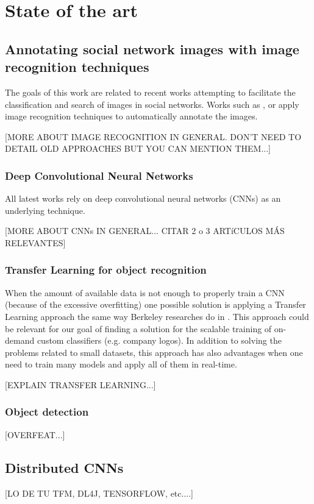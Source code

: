 
\chapter{State of the art}

\ifpdf
    \graphicspath{{Chapter2/Figs/Raster/}{Chapter2/Figs/PDF/}{Chapter2/Figs/}}
\else
    \graphicspath{{Chapter2/Figs/Vector/}{Chapter2/Figs/}}
\fi

\section[Short title]{Annotating social network images with image recognition techniques}

The goals of this work are related to recent works attempting to facilitate the classification and search of images in social networks. Works such as \cite{DBLP:journals/corr/ParkLK16}, \cite{conf/bigmm/TousTA15} or \cite{Denton:2015:UCH:2783258.2788576} apply image recognition techniques to automatically annotate the images. 

[MORE ABOUT IMAGE RECOGNITION IN GENERAL. DON'T NEED TO DETAIL OLD APPROACHES BUT YOU CAN MENTION THEM...]

\subsection{Deep Convolutional Neural Networks}

All latest works rely on deep convolutional neural networks (CNNs) as an underlying technique. 

[MORE ABOUT CNNs IN GENERAL... CITAR 2 o 3 ARTíCULOS MÁS RELEVANTES]

\subsection{Transfer Learning for object recognition}

When the amount of available data is not enough to properly train a CNN (because of the excessive overfitting) one possible solution is applying a Transfer Learning approach the same way Berkeley researches do in \cite{DBLP:conf/icml/DonahueJVHZTD14}. This approach could be relevant for our goal of finding a solution for the scalable training of on-demand custom classifiers (e.g. company logos). In addition to solving the problems related to small datasets, this approach has also advantages when one need to train many models and apply all of them in real-time.
  
[EXPLAIN TRANSFER LEARNING...]

\subsection{Object detection}

[OVERFEAT...]


\section{Distributed CNNs}

[LO DE TU TFM, DL4J, TENSORFLOW, etc....]




